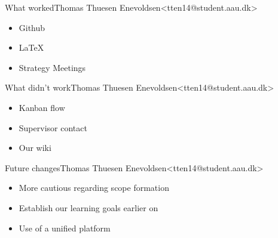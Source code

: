 \begin{frame}{What worked}{Thomas Thuesen Enevoldsen\newline<tten14@student.aau.dk>}
    \begin{itemize}
  	\item Github
  	\item LaTeX
  	\item Strategy Meetings
  \end{itemize}
\end{frame}

\begin{frame}{What didn't work}{Thomas Thuesen Enevoldsen\newline<tten14@student.aau.dk>}
    \begin{itemize}
  	\item Kanban flow
  	\item Supervisor contact
  	\item Our wiki
  \end{itemize}
\end{frame}

\begin{frame}{Future changes}{Thomas Thuesen Enevoldsen\newline<tten14@student.aau.dk>}
    \begin{itemize}
  	\item More cautious regarding scope formation
  	\item Establish our learning goals earlier on
  	\item Use of a unified platform 
  \end{itemize}
\end{frame}